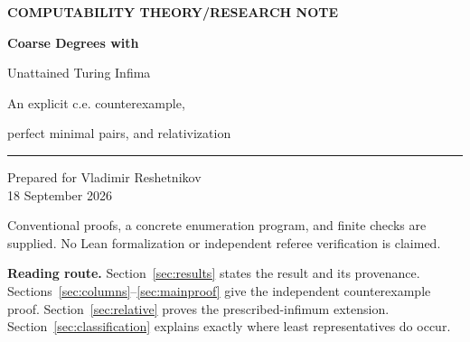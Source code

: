 \documentclass[11pt,a4paper]{article}
\newcommand{\zdeg}{\mathbf z}
\theoremstyle{definition}
\theoremstyle{remark}
\begin{document}
\hypersetup{pageanchor=false}
\begin{titlepage}
\vspace*{12mm}
{\small\sffamily\bfseries\color{navy}COMPUTABILITY THEORY\quad /\quad RESEARCH NOTE\par}
\vspace{15mm}
{\Huge\bfseries\color{navy}Coarse Degrees with\par Unattained Turing Infima\par}
\vspace{8mm}
{\Large An explicit c.e. counterexample,\par perfect minimal pairs, and relativization\par}
\vspace{13mm}
\noindent\rule{\textwidth}{0.5pt}
\vspace{5mm}
\noindent Prepared for Vladimir Reshetnikov\\[3pt]
18 September 2026
\vspace{10mm}
\begin{abstract}
We investigate whether a nonuniform coarse-equivalence class must contain a
representative of least Turing degree. We give an explicit computably enumerable
set whose coarse descriptions contain a perfect family of pairwise Turing
minimal pairs. Its uniform and nonuniform coarse classes consequently have no
least Turing representative, even when arbitrary total numerical functions are
allowed as representatives. Two witnessing descriptions can be chosen below
$\emptyset''$. The construction uses individually computable protected columns
and a two-reservoir finite-extension lemma; all infinite arguments are proved
in English. Relativizing and adding robust block coding yields, for every Turing
degree $\zdeg$, a coarse class whose representative spectrum has greatest lower
bound $\zdeg$ but does not attain it. We also characterize the nonuniform classes
having a least representative as precisely the classes of robustly coded reals.
The bare negative answer is already implicit in a 2015 result of
Hirschfeldt--Jockusch--Kuyper--Schupp; it is not claimed here as a new discovery.
The originality of the stronger perfect-family and prescribed-infimum
formulations remains unverified.
\end{abstract}
\vfill
\noindent\small Conventional proofs, a concrete enumeration program, and finite checks
are supplied. No Lean formalization or independent referee verification is claimed.
\end{titlepage}
\hypersetup{pageanchor=true}
\setcounter{tocdepth}{1}
\tableofcontents
\vspace{8mm}
\noindent\colorbox{pale}{\parbox{\dimexpr\textwidth-2\fboxsep\relax}{
\textbf{Reading route.} Section~\ref{sec:results} states the result and its
provenance. Sections~\ref{sec:columns}--\ref{sec:mainproof} give the independent
counterexample proof. Section~\ref{sec:relative} proves the prescribed-infimum
extension. Section~\ref{sec:classification} explains exactly where least
representatives do occur.}}
\newpage
\end{document}
